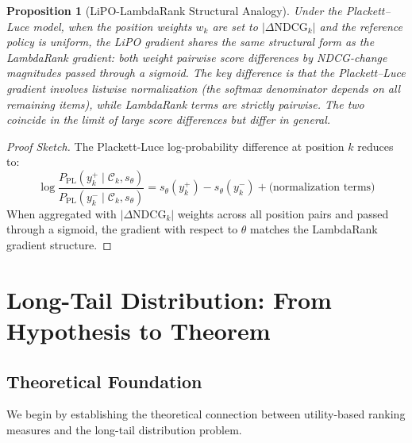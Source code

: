 \documentclass[11pt,a4paper]{article}
\theoremstyle{definition}
\theoremstyle{plain}
\newtheorem{proposition}[theorem]{Proposition}
\theoremstyle{remark}
\newcommand{\NDCG}{\mathrm{NDCG}}
\begin{document}
\begin{proposition}[LiPO-LambdaRank Structural Analogy]
\label{prop:lipo_lambda}
Under the Plackett--Luce model, when the position weights $w_k$ are set to $|\Delta \NDCG_k|$ and the reference policy is uniform, the LiPO gradient shares the same structural form as the LambdaRank gradient: both weight pairwise score differences by NDCG-change magnitudes passed through a sigmoid. The key difference is that the Plackett--Luce gradient involves listwise normalization (the softmax denominator depends on all remaining items), while LambdaRank terms are strictly pairwise. The two coincide in the limit of large score differences but differ in general.
\end{proposition}

\begin{proof}[Proof Sketch]
The Plackett-Luce log-probability difference at position $k$ reduces to:
\begin{equation}
    \log \frac{P_{\text{PL}}(y_k^+ \mid \mathcal{C}_k, s_\theta)}{P_{\text{PL}}(y_k^- \mid \mathcal{C}_k, s_\theta)} = s_\theta(y_k^+) - s_\theta(y_k^-) + \text{(normalization terms)}
\end{equation}
When aggregated with $|\Delta \NDCG_k|$ weights across all position pairs and passed through a sigmoid, the gradient with respect to $\theta$ matches the LambdaRank gradient structure.
\end{proof}

\section{Long-Tail Distribution: From Hypothesis to Theorem}
\label{sec:hypothesis1}

\subsection{Theoretical Foundation}
\label{subsec:h1_foundation}

We begin by establishing the theoretical connection between utility-based ranking measures and the long-tail distribution problem.
\end{document}
